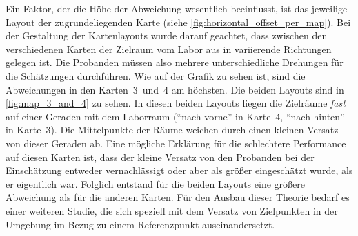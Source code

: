 Ein Faktor, der die Höhe der Abweichung wesentlich beeinflusst, ist das jeweilige Layout der zugrundeliegenden Karte (siehe \autoref{fig:horizontal_offset_per_map}).
Bei der Gestaltung der Kartenlayouts wurde darauf geachtet, dass zwischen den verschiedenen Karten der Zielraum vom Labor aus in variierende Richtungen gelegen ist.
Die Probanden müssen also mehrere unterschiedliche Drehungen für die Schätzungen durchführen.
Wie auf der Grafik zu sehen ist, sind die Abweichungen in den Karten~3~und~4 am höchsten.
Die beiden Layouts sind in \autoref{fig:map_3_and_4} zu sehen.
In diesen beiden Layouts liegen die Zielräume \emph{fast} auf einer Geraden mit dem Laborraum (\enquote{nach vorne} in Karte~4, \enquote{nach hinten} in Karte~3).
Die Mittelpunkte der Räume weichen durch einen kleinen Versatz von dieser Geraden ab.
Eine mögliche Erklärung für die schlechtere Performance auf diesen Karten ist, dass der kleine Versatz von den Probanden bei der Einschätzung entweder vernachlässigt oder aber als größer eingeschätzt wurde, als er eigentlich war.
Folglich entstand für die beiden Layouts eine größere Abweichung als für die anderen Karten.
Für den Ausbau dieser Theorie bedarf es einer weiteren Studie, die sich speziell mit dem Versatz von Zielpunkten in der Umgebung im Bezug zu einem Referenzpunkt auseinandersetzt.
